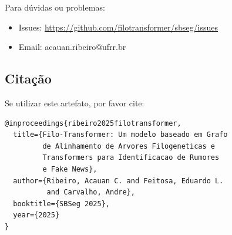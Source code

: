\documentclass[12pt]{article}
\begin{document}
Para d\'uvidas ou problemas:
\begin{itemize}
    \item Issues: \url{https://github.com/filotransformer/sbseg/issues}
    \item Email: acauan.ribeiro@ufrr.br
\end{itemize}

\subsection{Cita\c{c}\~ao}

Se utilizar este artefato, por favor cite:
\begin{verbatim}
@inproceedings{ribeiro2025filotransformer,
  title={Filo-Transformer: Um modelo baseado em Grafo 
         de Alinhamento de Arvores Filogeneticas e 
         Transformers para Identificacao de Rumores 
         e Fake News},
  author={Ribeiro, Acauan C. and Feitosa, Eduardo L. 
          and Carvalho, Andre},
  booktitle={SBSeg 2025},
  year={2025}
}
\end{verbatim}
\end{document}
